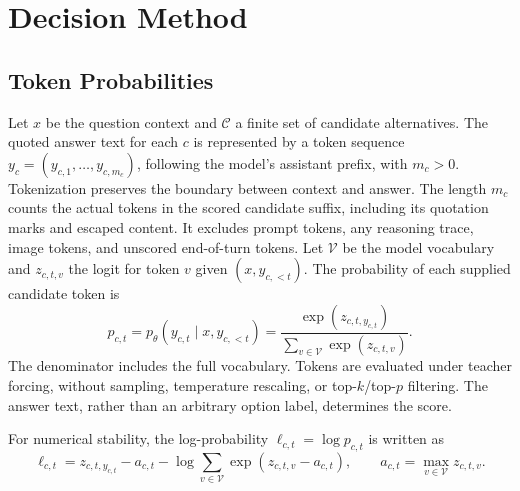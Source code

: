 \section{Decision Method}
\label{sec:scoring}
\subsection{Token Probabilities}
Let $x$ be the question context and $\mathcal{C}$ a finite set of candidate
alternatives. The quoted answer text for each $c$ is represented by a token
sequence $y_c=(y_{c,1},\ldots,y_{c,m_c})$, following the model's assistant
prefix, with $m_c>0$. Tokenization preserves the boundary between context and
answer. The length $m_c$ counts the actual tokens in the scored candidate
suffix, including its quotation marks and escaped content. It excludes prompt
tokens, any reasoning trace, image tokens, and unscored end-of-turn tokens.
Let $\mathcal{V}$ be the model vocabulary
and $z_{c,t,v}$ the logit for token $v$ given $(x,y_{c,<t})$.
The probability of each supplied candidate token is
\begin{equation}
  p_{c,t}=p_\theta(y_{c,t}\mid x,y_{c,<t})
  =\frac{\exp(z_{c,t,y_{c,t}})}
         {\sum_{v\in\mathcal{V}}\exp(z_{c,t,v})}.
  \label{eq:token-probability}
\end{equation}
The denominator includes the full vocabulary. Tokens are evaluated under
teacher forcing, without sampling, temperature rescaling, or top-$k$/top-$p$
filtering. The answer text, rather than an arbitrary option label, determines
the score.

For numerical stability, the log-probability $\ell_{c,t}=\log p_{c,t}$ is
written as
\begin{equation}
  \ell_{c,t}=z_{c,t,y_{c,t}}-a_{c,t}
  -\log\sum_{v\in\mathcal{V}}\exp(z_{c,t,v}-a_{c,t}),
  \qquad a_{c,t}=\max_{v\in\mathcal{V}}z_{c,t,v}.
  \label{eq:token-log-probability}
\end{equation}

